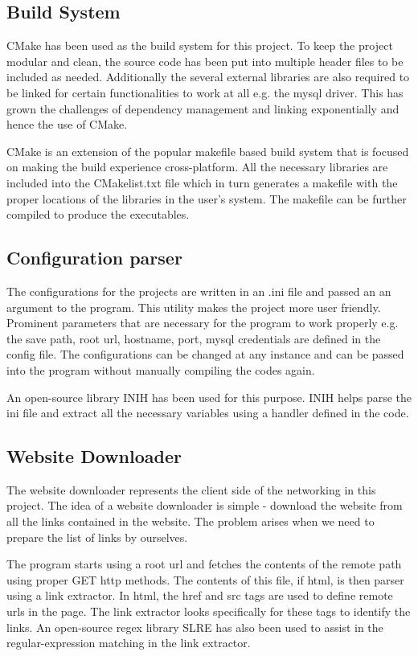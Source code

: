 \documentclass{project_report}
\begin{document}
\subsection{Build System}
CMake has been used as the build system for this project. To keep the project modular and clean, the source code has been put into multiple header files to be included as needed. Additionally the several external libraries are also required to be linked for certain functionalities to work at all e.g. the mysql driver. This has grown the challenges of dependency management and linking exponentially and hence the use of CMake. 

CMake is an extension of the popular makefile based build system that is focused on making the build experience cross-platform. All the necessary libraries are included into the CMakelist.txt file which in turn generates a makefile with the proper locations of the libraries in the user's system. The makefile can be further compiled to produce the executables.

\subsection{Configuration parser}

The configurations for the projects are written in an .ini file and passed an an argument to the program. This utility makes the project more user friendly. Prominent parameters that are necessary for the program to work properly e.g. the save path, root url, hostname, port, mysql credentials are defined in the config file. The configurations can be changed at any instance and can be passed into the program without manually compiling the codes again.

An open-source library INIH has been used for this purpose. INIH helps parse the ini file and extract all the necessary variables using a handler defined in the code.

\subsection{Website Downloader}

The website downloader represents the client side of the networking in this project. The idea of a website downloader is simple - download the website from all the links contained in the website. The problem arises when we need to prepare the list of links by ourselves.

The program starts using a root url and fetches the contents of the remote path using proper GET http methods. The contents of this file, if html,  is then parser using a link extractor. In html, the href and src tags are used to define remote urls in the page. The link extractor looks specifically for these tags to identify the links. An open-source regex library SLRE has also been used to assist in the regular-expression matching in the link extractor.
\end{document}
